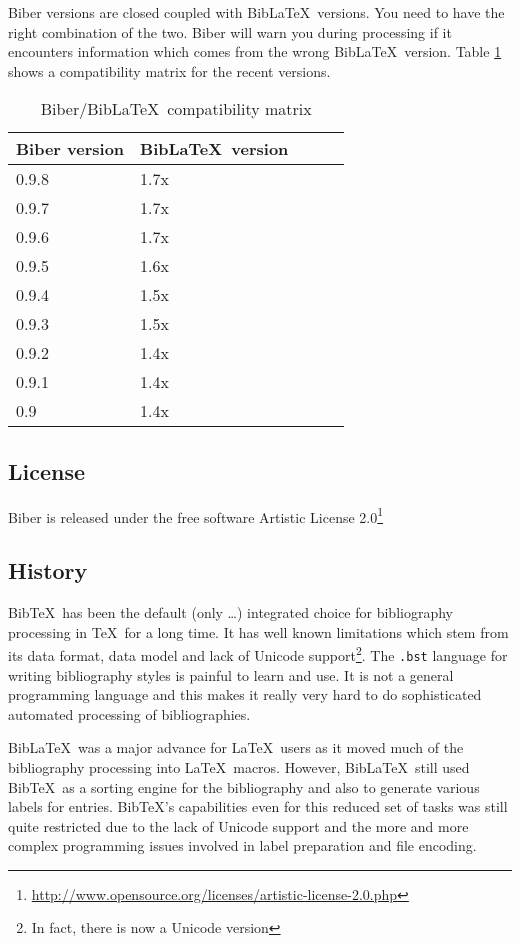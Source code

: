 \documentclass{ltxdockit}
\begin{document}
Biber versions are closed coupled with Bib\LaTeX\ versions. You
need to have the right combination of the two. Biber will warn you
during processing if it encounters information which comes from the wrong
Bib\LaTeX\ version. Table \ref{tab:compat} shows a compatibility
matrix for the recent versions.

\begin{table}
\begin{center}
\small
\begin{tabular}{lllll}
\toprule
Biber version & Bib\LaTeX\ version\\
\midrule
0.9.8 & 1.7x\\
0.9.7 & 1.7x\\
0.9.6 & 1.7x\\
0.9.5 & 1.6x\\
0.9.4 & 1.5x\\
0.9.3 & 1.5x\\
0.9.2 & 1.4x\\
0.9.1 & 1.4x\\
0.9 & 1.4x\\
\bottomrule
\end{tabular}
\end{center}
\caption{Biber/Bib\LaTeX\ compatibility matrix}
\label{tab:compat}
\end{table}

\subsection{License}

Biber is released under the free software Artistic License 2.0\footnote{\url{http://www.opensource.org/licenses/artistic-license-2.0.php}}

\subsection{History}

Bib\TeX\ has been the default (only \ldots) integrated choice for
bibliography processing in \TeX\ for a long time. It has well known
limitations which stem from its data format, data model and lack of Unicode
support\footnote{In fact, there is now a Unicode version}. The
\verb+.bst+ language for writing bibliography styles is painful to learn
and use. It is not a general programming language and this makes it really
very hard to do sophisticated automated processing of bibliographies.

Bib\LaTeX\ was a major advance for \LaTeX\ users as it moved much
of the bibliography processing into \LaTeX\ macros. However,
Bib\LaTeX\ still used Bib\TeX\ as a sorting engine for the
bibliography and also to generate various labels for
entries. Bib\TeX's capabilities even for this reduced set of
tasks was still quite restricted due to the lack of Unicode support and
the more and more complex programming issues involved in label
preparation and file encoding.
\end{document}
